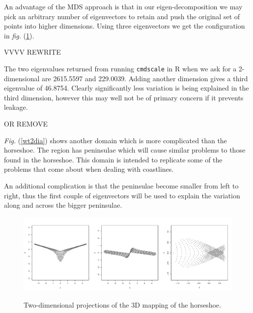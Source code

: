 \documentclass[a4paper,10pt]{amsart}
\newcommand{\fig}[1]{\emph{fig.} (\ref{#1})}
\newcommand{\Fig}[1]{\emph{Fig.} (\ref{#1})}
\begin{document}
An advantage of the MDS approach is that in our eigen-decomposition we may pick an arbitrary number of eigenvectors to retain and push the original set of points into higher dimensions. Using three eigenvectors we get the configuration in \fig{ramsay-mds-3d}.



VVVV REWRITE

The two eigenvalues returned from running \texttt{cmdscale} in \textsf{R} when we ask for a 2-dimensional are 2615.5597 and 229.0039. Adding another dimension gives a third eigenvalue of 46.8754. Clearly significantly less variation is being explained in the third dimension, however this may well not be of primary concern if it prevents leakage.

OR REMOVE

\Fig{wt2dia} shows another domain which is more complicated than the horseshoe. The region has peninsulae which will cause similar problems to those found in the horseshoe. This domain is intended to replicate some of the problems that come about when dealing with coastlines.


An additional complication is that the peninsulae become smaller from left to right, thus the first couple of eigenvectors will be used to explain the variation along and across the bigger peninsulae.




\begin{figure}
\centering
\includegraphics[trim=0in 0.5in 0in 0.25in, width=5.5in]{figs/ramsay-mds-3d.pdf} \\
\caption{Two-dimensional projections of the 3D mapping of the horseshoe.}
\label{ramsay-mds-3d}
\end{figure}
\end{document}
